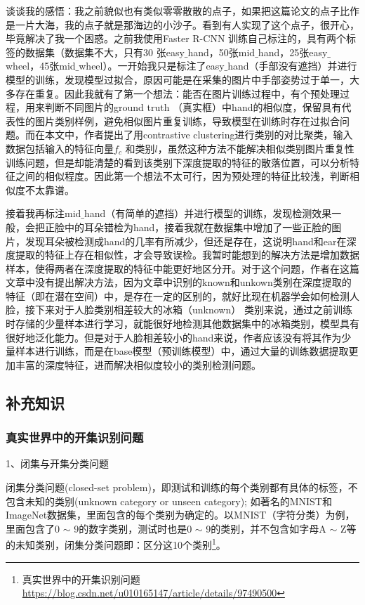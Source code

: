 谈谈我的感悟：我之前貌似也有类似零零散散的点子，如果把这篇论文的点子比作是一片大海，我的点子就是那海边的小沙子。看到有人实现了这个点子，很开心，毕竟解决了我一个困惑。之前我使用Faster R-CNN 训练自己标注的，具有两个标签的数据集（数据集不大，只有30 张easy$\_$hand，50张mid$\_$hand，25张easy$\_$wheel，45张mid$\_$wheel）。一开始我只是标注了easy$\_$hand（手部没有遮挡）并进行模型的训练，发现模型过拟合，原因可能是在采集的图片中手部姿势过于单一，大多存在重复。因此我就有了第一个想法：能否在图片训练过程中，有个预处理过程，用来判断不同图片的ground truth （真实框）中hand的相似度，保留具有代表性的图片类别样例，避免相似图片重复训练，导致模型在训练时存在过拟合问题。而在本文中，作者提出了用contrastive clustering进行类别的对比聚类，输入数据包括输入的特征向量$f_c$ 和类别$l$，虽然这种方法不能解决相似类别图片重复性训练问题，但是却能清楚的看到该类别下深度提取的特征的散落位置，可以分析特征之间的相似程度。因此第一个想法不太可行，因为预处理的特征比较浅，判断相似度不太靠谱。

接着我再标注mid$\_$hand（有简单的遮挡）并进行模型的训练，发现检测效果一般，会把正脸中的耳朵错检为hand，接着我就在数据集中增加了一些正脸的图片，发现耳朵被检测成hand的几率有所减少，但还是存在，这说明hand和ear在深度提取的特征上存在相似性，才会导致误检。我暂时能想到的解决方法是增加数据样本，使得两者在深度提取的特征中能更好地区分开。对于这个问题，作者在这篇文章中没有提出解决方法，因为文章中识别的known和unkown类别在深度提取的特征（即在潜在空间）中，是存在一定的区别的，就好比现在机器学会如何检测人脸，接下来对于人脸类别相差较大的冰箱（unknown） 类别来说，通过之前训练时存储的少量样本进行学习，就能很好地检测其他数据集中的冰箱类别，模型具有很好地泛化能力。但是对于人脸相差较小的hand来说，作者应该没有将其作为少量样本进行训练，而是在base模型（预训练模型）中，通过大量的训练数据提取更加丰富的深度特征，进而解决相似度较小的类别检测问题。

\subsection{补充知识}

\subsubsection{真实世界中的开集识别问题}

1、闭集与开集分类问题

闭集分类问题(closed-set problem)，即测试和训练的每个类别都有具体的标签，不包含未知的类别(unknown category or unseen category); 如著名的MNIST和ImageNet数据集，里面包含的每个类别为确定的。以MNIST（字符分类）为例，里面包含了0 $\sim$ 9的数字类别，测试时也是0 $\sim$ 9的类别，并不包含如字母A $\sim$ Z等的未知类别，闭集分类问题即：区分这10个类别\footnote{真实世界中的开集识别问题 \quad \url{https://blog.csdn.net/u010165147/article/details/97490500}}。

